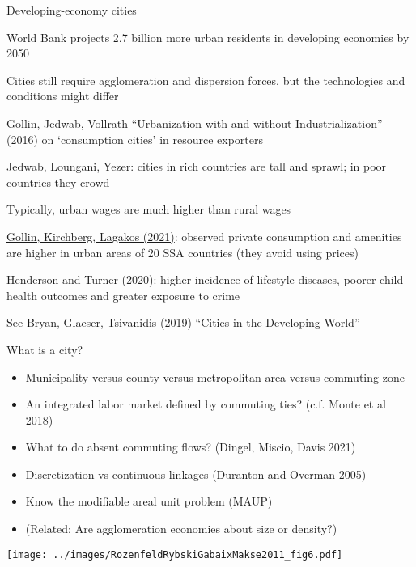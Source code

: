 \documentclass[11pt,notes=hide,aspectratio=169]{beamer}
\begin{document}
\begin{frame}{Developing-economy cities}
\begin{itemize}{\small
\item World Bank projects 2.7 billion more urban residents in developing economies by 2050
\item Cities still require agglomeration and dispersion forces, but the technologies and conditions might differ
\item Gollin, Jedwab, Vollrath ``Urbanization with and without Industrialization'' (2016) on `consumption cities' in resource exporters
\item Jedwab, Loungani, Yezer: cities in rich countries are tall and sprawl; in poor countries they crowd
\item Typically, urban wages are much higher than rural wages
\item \href{https://doi.org/10.1016/j.jue.2020.103301}{Gollin, Kirchberg, Lagakos (2021)}: observed private consumption and amenities are higher in urban areas of 20 SSA countries (they avoid using prices)
\item Henderson and Turner (2020): higher incidence of lifestyle diseases, poorer child health outcomes and greater exposure to
crime
\item See Bryan, Glaeser, Tsivanidis (2019) ``\href{https://doi.org/10.1146/annurev-economics-080218-030303}{Cities in the Developing World}''
}\end{itemize}
\end{frame}
\begin{frame}{What is a city?}
\begin{itemize}
	\item Municipality versus county versus metropolitan area versus commuting zone
	\item An integrated labor market defined by commuting ties? (c.f. Monte et al 2018)
	\item What to do absent commuting flows? (Dingel, Miscio, Davis 2021)
	\item Discretization vs continuous linkages (Duranton and Overman 2005)
	\item Know the modifiable areal unit problem (MAUP)
	\item (Related: Are agglomeration economies about size or density?)
\end{itemize}
\texttt{[image: ../images/RozenfeldRybskiGabaixMakse2011\_fig6.pdf]}
\end{frame}
\end{document}

